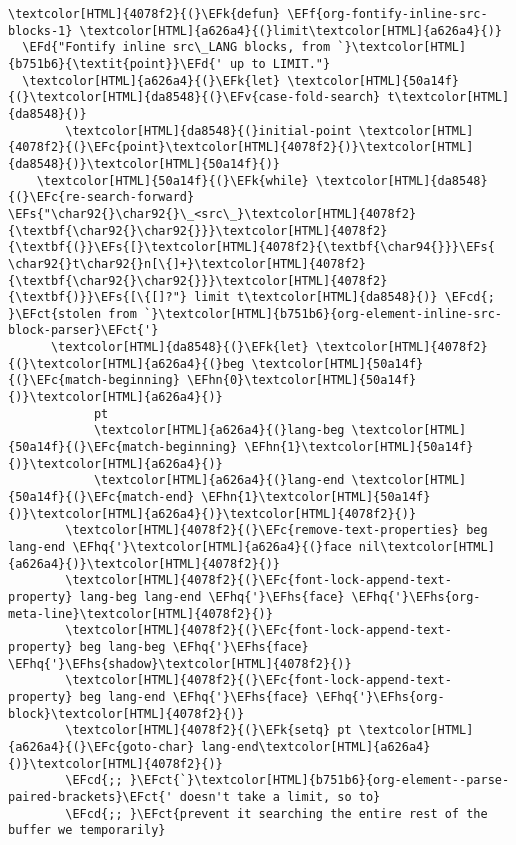 \documentclass{scrartcl}
\newcommand{\EFk}[1]{\textcolor{EFk}{#1}} %
\newcommand{\EFd}[1]{\textcolor{EFd}{\textit{#1}}} %
\newcommand{\EFs}[1]{\textcolor{EFs}{#1}} %
\newcommand{\EFct}[1]{\textcolor{EFct}{#1}} %
\newcommand{\EFc}[1]{\textcolor{EFc}{#1}} %
\newcommand{\EFv}[1]{\textcolor{EFv}{#1}} %
\newcommand{\EFf}[1]{\textcolor{EFf}{#1}} %
\newcommand{\EFcd}[1]{\textcolor{EFcd}{#1}} %
\newcommand{\EFhn}[1]{\textcolor{EFhn}{\textbf{#1}}} %
\newcommand{\EFhq}[1]{\textcolor{EFhq}{#1}} %
\newcommand{\EFhs}[1]{\textcolor{EFhs}{#1}} %
\begin{document}
\begin{enumerate}
\begin{Code}
\begin{Verbatim}[]
\textcolor[HTML]{4078f2}{(}\EFk{defun} \EFf{org-fontify-inline-src-blocks-1} \textcolor[HTML]{a626a4}{(}limit\textcolor[HTML]{a626a4}{)}
  \EFd{"Fontify inline src\_LANG blocks, from `}\textcolor[HTML]{b751b6}{\textit{point}}\EFd{' up to LIMIT."}
  \textcolor[HTML]{a626a4}{(}\EFk{let} \textcolor[HTML]{50a14f}{(}\textcolor[HTML]{da8548}{(}\EFv{case-fold-search} t\textcolor[HTML]{da8548}{)}
        \textcolor[HTML]{da8548}{(}initial-point \textcolor[HTML]{4078f2}{(}\EFc{point}\textcolor[HTML]{4078f2}{)}\textcolor[HTML]{da8548}{)}\textcolor[HTML]{50a14f}{)}
    \textcolor[HTML]{50a14f}{(}\EFk{while} \textcolor[HTML]{da8548}{(}\EFc{re-search-forward} \EFs{"\char92{}\char92{}\_<src\_}\textcolor[HTML]{4078f2}{\textbf{\char92{}\char92{}}}\textcolor[HTML]{4078f2}{\textbf{(}}\EFs{[}\textcolor[HTML]{4078f2}{\textbf{\char94{}}}\EFs{ \char92{}t\char92{}n[\{]+}\textcolor[HTML]{4078f2}{\textbf{\char92{}\char92{}}}\textcolor[HTML]{4078f2}{\textbf{)}}\EFs{[\{[]?"} limit t\textcolor[HTML]{da8548}{)} \EFcd{; }\EFct{stolen from `}\textcolor[HTML]{b751b6}{org-element-inline-src-block-parser}\EFct{'}
      \textcolor[HTML]{da8548}{(}\EFk{let} \textcolor[HTML]{4078f2}{(}\textcolor[HTML]{a626a4}{(}beg \textcolor[HTML]{50a14f}{(}\EFc{match-beginning} \EFhn{0}\textcolor[HTML]{50a14f}{)}\textcolor[HTML]{a626a4}{)}
            pt
            \textcolor[HTML]{a626a4}{(}lang-beg \textcolor[HTML]{50a14f}{(}\EFc{match-beginning} \EFhn{1}\textcolor[HTML]{50a14f}{)}\textcolor[HTML]{a626a4}{)}
            \textcolor[HTML]{a626a4}{(}lang-end \textcolor[HTML]{50a14f}{(}\EFc{match-end} \EFhn{1}\textcolor[HTML]{50a14f}{)}\textcolor[HTML]{a626a4}{)}\textcolor[HTML]{4078f2}{)}
        \textcolor[HTML]{4078f2}{(}\EFc{remove-text-properties} beg lang-end \EFhq{'}\textcolor[HTML]{a626a4}{(}face nil\textcolor[HTML]{a626a4}{)}\textcolor[HTML]{4078f2}{)}
        \textcolor[HTML]{4078f2}{(}\EFc{font-lock-append-text-property} lang-beg lang-end \EFhq{'}\EFhs{face} \EFhq{'}\EFhs{org-meta-line}\textcolor[HTML]{4078f2}{)}
        \textcolor[HTML]{4078f2}{(}\EFc{font-lock-append-text-property} beg lang-beg \EFhq{'}\EFhs{face} \EFhq{'}\EFhs{shadow}\textcolor[HTML]{4078f2}{)}
        \textcolor[HTML]{4078f2}{(}\EFc{font-lock-append-text-property} beg lang-end \EFhq{'}\EFhs{face} \EFhq{'}\EFhs{org-block}\textcolor[HTML]{4078f2}{)}
        \textcolor[HTML]{4078f2}{(}\EFk{setq} pt \textcolor[HTML]{a626a4}{(}\EFc{goto-char} lang-end\textcolor[HTML]{a626a4}{)}\textcolor[HTML]{4078f2}{)}
        \EFcd{;; }\EFct{`}\textcolor[HTML]{b751b6}{org-element--parse-paired-brackets}\EFct{' doesn't take a limit, so to}
        \EFcd{;; }\EFct{prevent it searching the entire rest of the buffer we temporarily}

\end{Verbatim}
\end{Code}
\end{enumerate}
\end{document}
